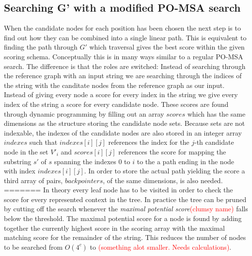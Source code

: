 \documentclass{article}
\begin{document}
\subsection{Searching G' with a modified PO-MSA search}
When the candidate nodes for each position has been chosen the next step is to find out how they can be combined into a single linear path. This is equivalent to finding the path through $G'$ which traversal gives the best score within the given scoring schema. Conceptually this is in many ways similar to a regular PO-MSA search. The difference is that the roles are switched: Instead of searching through the reference graph with an input string we are searching through the indices of the string with the canditate nodes from the reference graph as our input. Instead of giving every node a score for every index in the string we give every index of the string a score for every candidate node. These scores are found through dynamic programming by filling out an array $scores$ which has the same dimensions as the structure storing the candidate node sets. Because sets are not indexable, the indexes of the candidate nodes are also stored in an integer array $indexes$ such that $indexes[i][j]$ references the index for the $j$-th candidate node in the set $V'_i$  and $scores[i][j]$ references the score for mapping the substring $s'$ of $s$ spanning the indexes 0 to $i$ to the a path ending in the node with index $indexes[i][j]$. In order to store the actual path yielding the score a third array of pairs, $backpointers$, of the same dimensions, is also needed.\\
=======
In theory every leaf node has to be visited in order to check the score for every represented context in the tree. In practice the tree can be pruned by cutting off the search whenever the \textit{maximal potential score}\textcolor{red}{(clumsy name)} falls below the threshold. The maximal potential score for a node is found by adding together the currently highest score in the scoring array with the maximal matching score for the remainder of the string. This reduces the number of nodes to be searched from $O(4^c)$ to \textcolor{red}{(something alot smaller. Needs calculations)}.\\
\end{document}
